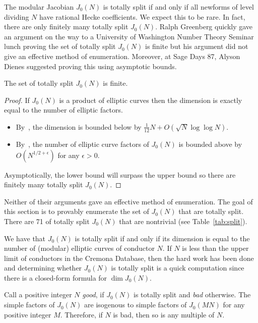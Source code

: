 The modular Jacobian $J_0(N)$ is totally split if and only if all newforms of
level dividing $N$ have rational Hecke coefficients. We expect this to be rare.
In fact, there are only finitely many totally split $J_0(N)$. Ralph Greenberg
quickly gave an argument on the way to a University of Washington Number
Theory Seminar lunch proving the set of totally split $J_0(N)$ is finite but
his argument did not give an effective method of enumeration. Moreover, at Sage
Days 87, Alyson Dienes suggested proving this using asymptotic bounds.
\begin{proposition}%
    \label{prop:totally_split}
    The set of totally split $J_0(N)$ is finite.
\end{proposition}
\begin{proof}
    If $J_0(N)$ is a product of elliptic curves then the dimension is
    exactly equal to the number of elliptic factors.
    \begin{itemize}
        \item
            By~\cite[Thm. 6]{martin:dimension}, the dimension is bounded below
            by $\frac{1}{12}N + O(\sqrt{N}\log\log N)$.
        \item
            By~\cite[Cor. 2]{brumer-silverman:number}, the number of elliptic
            curve factors of $J_0(N)$ is bounded above by $O(N^{1/2+\epsilon})$
            for any $\epsilon>0$.
    \end{itemize}
    Asymptotically, the lower bound will surpass the upper bound so there are
    finitely many totally split $J_0(N)$.
\end{proof}
Neither of their arguments gave an effective method of enumeration. The goal of
this section is to provably enumerate the set of $J_0(N)$ that are totally
split. There are 71 of totally split $J_0(N)$ that are nontrivial (see
Table~\ref{tab:split}).

We have that $J_0(N)$ is totally split if and only if its dimension is equal to
the number of (modular) elliptic curves of conductor $N$. If $N$ is less than
the upper limit of conductors in the Cremona Database, then the hard work has
been done and determining whether $J_0(N)$ is totally split is a quick
computation since there is a closed-form formula for $\dim J_0(N)$.

Call a positive integer $N$ \emph{good}, if $J_0(N)$ is totally split and
\emph{bad} otherwise. The simple factors of $J_0(N)$ are isogenous to simple
factors of $J_0(MN)$ for any positive integer $M$. Therefore, if $N$ is bad,
then so is any multiple of $N$. 

